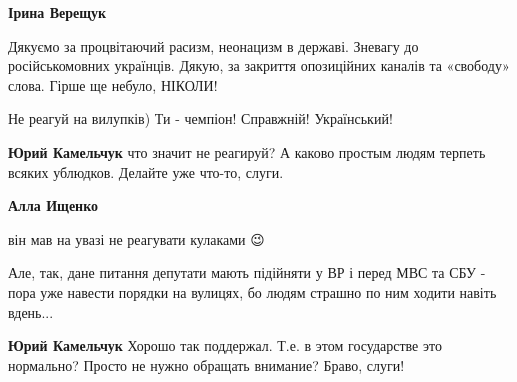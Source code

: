 \begin{itemize}
\begin{itemize}
 
\textbf{Ірина Верещук} 

Дякуємо за процвітаючий расизм, неонацизм в
державі. Зневагу до російськомовних українців. Дякую, за закриття опозиційних
каналів та «свободу» слова. Гірше ще небуло, НІКОЛИ!

\end{itemize}


Не реагуй на вилупків) Ти - чемпіон! Справжній! Український!

\begin{itemize}
 
\textbf{Юрий Камельчук} что значит не реагируй? А каково простым людям терпеть всяких ублюдков. Делайте уже что-то, слуги.

 
\textbf{Алла Ищенко} 

він мав на увазі не реагувати кулаками 😉

Але, так, дане питання депутати мають підійняти у ВР і перед МВС та СБУ - пора
уже навести порядки на вулицях, бо людям страшно по ним ходити навіть вдень...

 
\textbf{Юрий Камельчук} Хорошо так поддержал. Т.е. в этом государстве это нормально? Просто не нужно обращать внимание? Браво, слуги!

 

\end{itemize}
\end{itemize}

